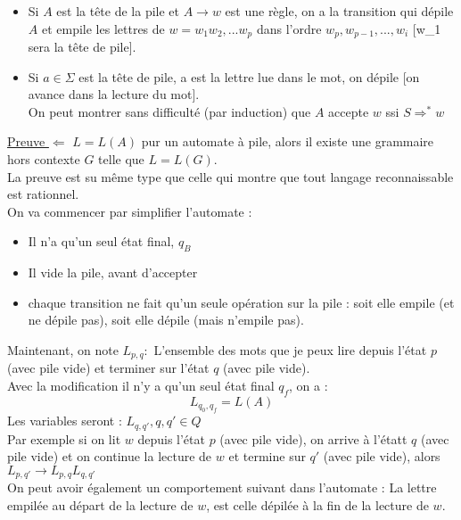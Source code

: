 \documentclass{article}
\begin{document}
\begin{enumerate}
\begin{itemize}
            \item Si $A$ est la tête de la pile et $A \rightarrow w$ est une règle, on a la transition qui dépile $A$ et empile les lettres de $w=w_1w_2,...w_p$ dans l'ordre $w_p,w_{p-1},...,w_i$ [w_1 sera la tête de pile].
            \item Si $a \in \Sigma$ est la tête de pile, a est la lettre lue dans le mot, on dépile [on avance dans la lecture du mot]. \\
            On peut montrer sans difficulté (par induction) que $A$ accepte $w$ ssi $S \Rightarrow^* w$\\
        \end{itemize}
        \underline{Preuve $\Leftarrow$} 
        $L=L(A)$ pur un automate à pile, alors il existe une grammaire hors contexte $G$ telle que $L=L(G)$. \\
        La preuve est su même type que celle qui montre que tout langage reconnaissable est rationnel. \\
        On va commencer par simplifier l'automate : \\ 
        \begin{itemize}
            \item Il n'a qu'un seul état final, $q_B$
            \item Il vide la pile, avant d'accepter
            \item chaque transition ne fait qu'un seule opération sur la pile : soit elle empile (et ne dépile pas), soit elle dépile (mais n'empile pas). \\
        \end{itemize}
        Maintenant, on note $L_{p,q} : $ L'ensemble des mots que je peux lire depuis l'état $p$(avec pile vide) et terminer sur l'état $q$ (avec pile vide). \\
        Avec la modification il n'y a qu'un seul état final $q_f$, on a : 
        \begin{equation*}
            L_{q_0,q_f}=L(A)    
        \end{equation*}
        Les variables seront : $L_{q,q'}, q,q' \in Q$ \\
        Par exemple si on lit $w$ depuis l'état $p$ (avec pile vide), on arrive à l'étatt $q$ (avec pile vide) et on continue la lecture de $w$ et termine sur $q'$ (avec pile vide), alors $L_{p,q'} \rightarrow L_{p,q}L_{q,q'}$ \\
        On peut avoir également un comportement suivant dans l'automate : La lettre empilée au départ de la lecture de $w$, est celle dépilée à la fin de la lecture de $w$. \\ 

\end{enumerate}
\end{document}

